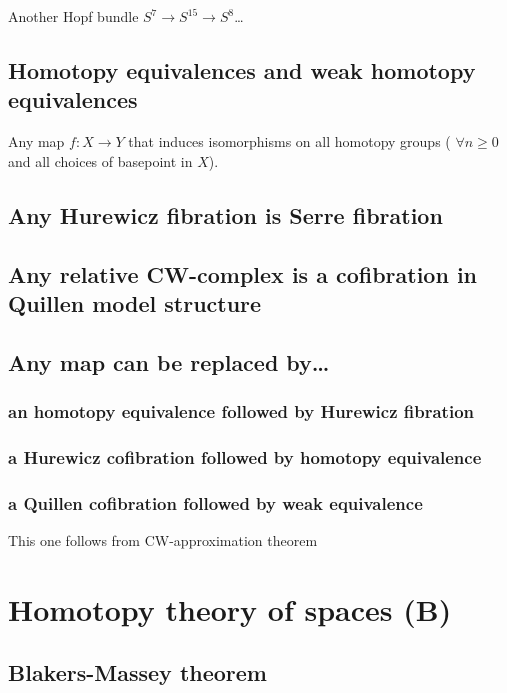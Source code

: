 \begin{remark}
\begin{example}
	Another Hopf bundle $S^7\to S^{15}\to S^8$…
\end{example}

\subsection{Homotopy equivalences and weak homotopy equivalences}

\begin{defn}
	Any map $f:X\to Y$ that induces isomorphisms on all homotopy groups ( $\forall n\geq 0$ and all choices of basepoint in $X$).
\end{defn}

\subsection{Any Hurewicz fibration is Serre fibration}
\subsection{Any relative CW-complex is a cofibration in Quillen model structure}
\subsection{Any map can be replaced by…} 
\subsubsection{an homotopy equivalence followed by Hurewicz fibration}
\subsubsection{a Hurewicz cofibration followed by homotopy equivalence}
\subsubsection{a Quillen cofibration followed by weak equivalence}
This one follows from CW-approximation theorem

\section{Homotopy theory  of spaces (B)}

\subsection{Blakers-Massey theorem}


\end{remark}
